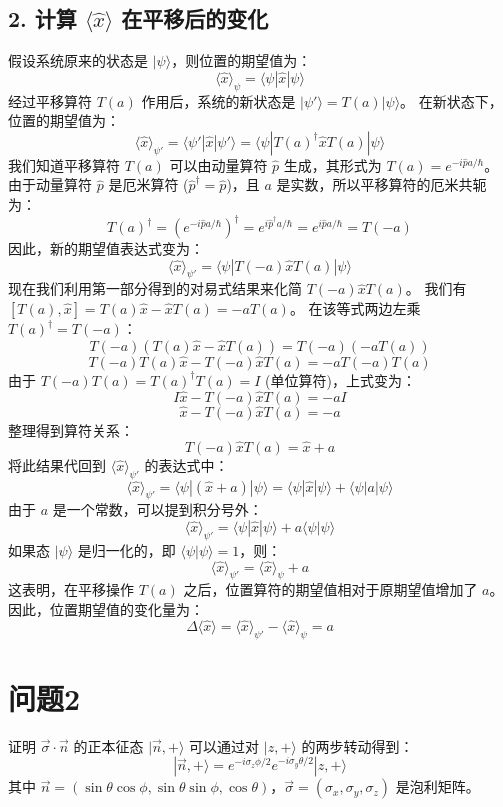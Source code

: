 \documentclass{article}
\begin{document}
\subsection*{2. 计算 \(\langle \hat{x} \rangle\) 在平移后的变化}
假设系统原来的状态是 \(|\psi\rangle\)，则位置的期望值为：
\[ \langle \hat{x} \rangle_{\psi} = \langle\psi|\hat{x}|\psi\rangle \]
经过平移算符 \(T(a)\) 作用后，系统的新状态是 \(|\psi'\rangle = T(a)|\psi\rangle\)。
在新状态下，位置的期望值为：
\[ \langle \hat{x} \rangle_{\psi'} = \langle\psi'|\hat{x}|\psi'\rangle = \langle\psi|T(a)^\dagger \hat{x} T(a)|\psi\rangle \]
我们知道平移算符 \(T(a)\) 可以由动量算符 \(\hat{p}\) 生成，其形式为 \(T(a) = e^{-i\hat{p}a/\hbar}\)。
由于动量算符 \(\hat{p}\) 是厄米算符 (\(\hat{p}^\dagger = \hat{p}\))，且 \(a\) 是实数，所以平移算符的厄米共轭为：
\[ T(a)^\dagger = (e^{-i\hat{p}a/\hbar})^\dagger = e^{i\hat{p}^\dagger a/\hbar} = e^{i\hat{p}a/\hbar} = T(-a) \]
因此，新的期望值表达式变为：
\[ \langle \hat{x} \rangle_{\psi'} = \langle\psi|T(-a) \hat{x} T(a)|\psi\rangle \]
现在我们利用第一部分得到的对易式结果来化简 \(T(-a) \hat{x} T(a)\)。
我们有 \([T(a), \hat{x}] = T(a)\hat{x} - \hat{x}T(a) = -a T(a)\)。
在该等式两边左乘 \(T(a)^\dagger = T(-a)\)：
\[ T(-a)(T(a)\hat{x} - \hat{x}T(a)) = T(-a)(-a T(a)) \]
\[ T(-a)T(a)\hat{x} - T(-a)\hat{x}T(a) = -a T(-a)T(a) \]
由于 \(T(-a)T(a) = T(a)^\dagger T(a) = I\) (单位算符)，上式变为：
\[ I\hat{x} - T(-a)\hat{x}T(a) = -a I \]
\[ \hat{x} - T(-a)\hat{x}T(a) = -a \]
整理得到算符关系：
\[ T(-a)\hat{x}T(a) = \hat{x} + a \]
将此结果代回到 \(\langle \hat{x} \rangle_{\psi'}\) 的表达式中：
\[ \langle \hat{x} \rangle_{\psi'} = \langle\psi|(\hat{x} + a)|\psi\rangle = \langle\psi|\hat{x}|\psi\rangle + \langle\psi|a|\psi\rangle \]
由于 \(a\) 是一个常数，可以提到积分号外：
\[ \langle \hat{x} \rangle_{\psi'} = \langle\psi|\hat{x}|\psi\rangle + a\langle\psi|\psi\rangle \]
如果态 \(|\psi\rangle\) 是归一化的，即 \(\langle\psi|\psi\rangle = 1\)，则：
\[ \langle \hat{x} \rangle_{\psi'} = \langle \hat{x} \rangle_{\psi} + a \]
这表明，在平移操作 \(T(a)\) 之后，位置算符的期望值相对于原期望值增加了 \(a\)。
因此，位置期望值的变化量为：
\[ \Delta \langle \hat{x} \rangle = \langle \hat{x} \rangle_{\psi'} - \langle \hat{x} \rangle_{\psi} = a \]

\newpage

\section*{问题2}
证明 \(\vec{\sigma} \cdot \vec{n}\) 的正本征态 \(|\vec{n},+\rangle\) 可以通过对 \(|z,+\rangle\) 的两步转动得到：
\[ |\vec{n},+\rangle = e^{-i\sigma_z \phi/2} e^{-i\sigma_y \theta/2} |z,+\rangle \]
其中 \(\vec{n} = (\sin\theta\cos\phi, \sin\theta\sin\phi, \cos\theta)\)，\(\vec{\sigma} = (\sigma_x, \sigma_y, \sigma_z)\) 是泡利矩阵。
\end{document}
